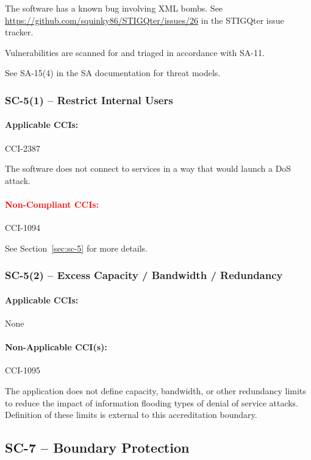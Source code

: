 \documentclass[letterpaper, 10pt, twoside]{article}
\begin{document}
The software has a known bug involving XML bombs. See \href{Issue #26}{https://github.com/squinky86/STIGQter/issues/26} in the STIGQter issue tracker.

Vulnerabilities are scanned for and triaged in accordance with SA-11.

See SA-15(4) in the SA documentation for threat models.

\subsubsection{SC-5(1) -- Restrict Internal Users}

\paragraph{Applicable CCIs:} CCI-2387

The software does not connect to services in a way that would launch a DoS attack.

\paragraph{\textcolor{red}{Non-Compliant CCIs:}} CCI-1094

See Section~\ref{sec:sc-5} for more details.

\subsubsection{SC-5(2) -- Excess Capacity / Bandwidth / Redundancy}

\paragraph{Applicable CCIs:} None

\paragraph{Non-Applicable CCI(s):} CCI-1095

The application does not define capacity, bandwidth, or other redundancy limits to reduce the impact of information flooding types of denial of service attacks. Definition of these limits is external to this accreditation boundary.

\subsection{SC-7 -- Boundary Protection}
\end{document}
